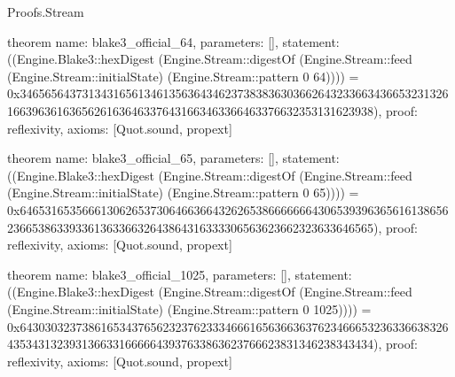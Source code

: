 \begin{lexlean}{Proofs.Stream}
\begin{semanticmodule}
theorem{
  name: blake3_official_64,
  parameters: [],
  statement: ((Engine.Blake3::hexDigest (Engine.Stream::digestOf (Engine.Stream::feed (Engine.Stream::initialState) (Engine.Stream::pattern 0 64)))) = 0x34656564373134316561346135636434623738383630366264323366343665323132616639636163656261636463376431663463366463376632353131623938),
  proof: reflexivity{},
  axioms: [Quot.sound, propext]
}

theorem{
  name: blake3_official_65,
  parameters: [],
  statement: ((Engine.Blake3::hexDigest (Engine.Stream::digestOf (Engine.Stream::feed (Engine.Stream::initialState) (Engine.Stream::pattern 0 65)))) = 0x64653165356661306265373064663664326265386666666430653939636561613865623665386339336136336632643864316333306563623662323633646565),
  proof: reflexivity{},
  axioms: [Quot.sound, propext]
}

theorem{
  name: blake3_official_1025,
  parameters: [],
  statement: ((Engine.Blake3::hexDigest (Engine.Stream::digestOf (Engine.Stream::feed (Engine.Stream::initialState) (Engine.Stream::pattern 0 1025)))) = 0x64303032373861653437656232376233346661656366363762346665323633663832643534313239313663316666643937633863623766623831346238343434),
  proof: reflexivity{},
  axioms: [Quot.sound, propext]
}
\end{semanticmodule}
\end{lexlean}
